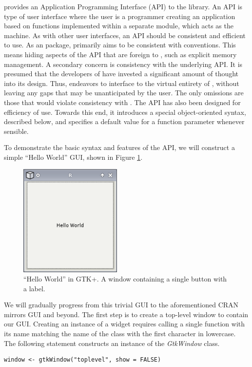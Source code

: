 \documentclass[article]{jss}
\begin{document}
 provides an Application Programming Interface (API) to the  
library. An API is type of user interface where the user
is a programmer creating an application based on functions implemented within a 
separate module, which acts as the machine. As with other user interfaces,
an API should be consistent and efficient to use. As an  package,
 primarily aims to be consistent with  conventions. This
means hiding aspects of the  API that are foreign to ,
such as explicit memory management. A secondary concern is consistency 
with the underlying  API. It is presumed that the developers of
 have invested a significant amount of thought into its design. Thus,
 endeavors to interface  to the virtual entirety of ,
without leaving any gaps that may be unanticipated by the user. 
The only omissions are those that would violate consistency with .
The  API has also been designed for efficiency of use. Towards this end,
it introduces a special object-oriented syntax, described below, and specifies
a default value for a function parameter whenever sensible.

To demonstrate the basic syntax and
features of the  API, we will construct a simple ``Hello World'' GUI,
shown in Figure \ref{fig:hello-world}. 

\begin{figure}
\begin{center}
\includegraphics[width=2in]{hello-world.png}
\caption{\label{fig:hello-world}``Hello World'' in GTK+. 
A window containing a single button with a label.}
\end{center}
\end{figure}

We will gradually 
progress from this trivial GUI to the aforementioned CRAN mirrors GUI and beyond.
The first step is to create a top-level window to contain our GUI.
Creating an instance of a  widget requires calling a single  
function with its name matching the name of the class with the first character in 
lowercase. The following statement constructs an instance of the \emph{GtkWindow} class.
\begin{verbatim}
window <- gtkWindow("toplevel", show = FALSE)
\end{verbatim}
\end{document}
